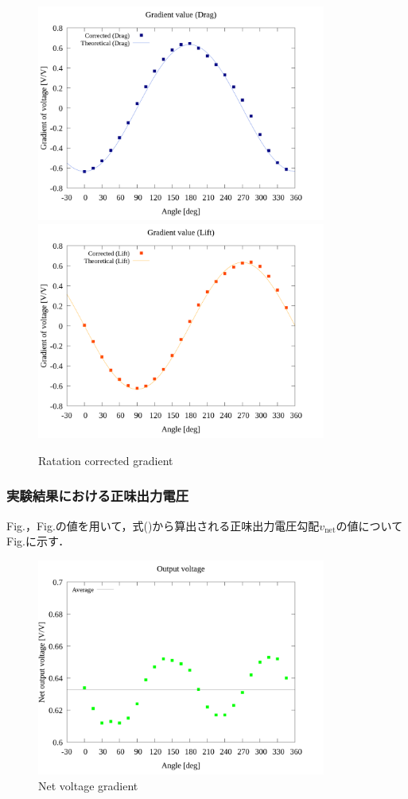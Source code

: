 \begin{figure}[htbp]
  \begin{center}
    \includegraphics[width=95mm]{../../02_workspace/result/2-ex/plot/21/21-4_corrected_angle_drag.png}
    \includegraphics[width=95mm]{../../02_workspace/result/2-ex/plot/21/21-4_corrected_angle_lift.png}
  \end{center}
  \caption{Ratation corrected gradient}
\end{figure}

\newpage

\subsubsection{実験結果における正味出力電圧}
Fig.，Fig.の値を用いて，式()から算出される正味出力電圧勾配$v_{\mathrm{net}}$の値について
Fig.に示す．

\begin{figure}[htbp]
  \centering
  \includegraphics[width=95mm]{../../02_workspace/result/2-ex/plot/09/09_summary-outputvoltage-net.png}
  \caption{Net voltage gradient}
\end{figure}

